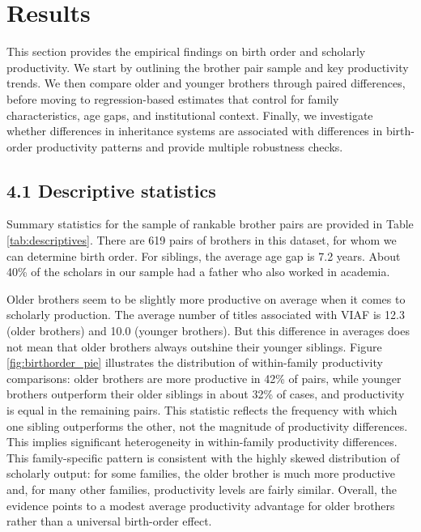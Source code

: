 \setcounter{section}{6}
\section*{Results}

This section provides the empirical findings on birth order and scholarly productivity.
We start by outlining the brother pair sample and key productivity trends.
We then compare older and younger brothers through paired differences, before moving to regression-based estimates that control for family characteristics, age gaps, and institutional context.
Finally, we investigate whether differences in inheritance systems are associated with differences in birth-order productivity patterns and provide multiple robustness checks.

\subsection*{4.1 Descriptive statistics}

Summary statistics for the sample of rankable brother pairs are provided in Table \ref{tab:descriptives}. There are 619 pairs of brothers in this dataset, for whom we can determine birth order. For siblings, the average age gap is 7.2 years. About 40\% of the scholars in our sample had a father who also worked in academia.

Older brothers seem to be slightly more productive on average when it comes to scholarly production. The average number of titles associated with VIAF is 12.3 (older brothers) and 10.0 (younger brothers). But this difference in averages does not mean that older brothers always outshine their younger siblings. Figure \ref{fig:birthorder_pie} illustrates the distribution of within-family productivity comparisons: older brothers are more productive in 42\% of pairs, while younger brothers outperform their older siblings in about 32\% of cases, and productivity is equal in the remaining pairs. This statistic reflects the frequency with which one sibling outperforms the other, not the magnitude of productivity differences. This implies significant heterogeneity in within-family productivity differences. This family-specific pattern is consistent with the highly skewed distribution of scholarly output: for some families, the older brother is much more productive and, for many other families, productivity levels are fairly similar. Overall, the evidence points to a modest average productivity advantage for older brothers rather than a universal birth-order effect.

